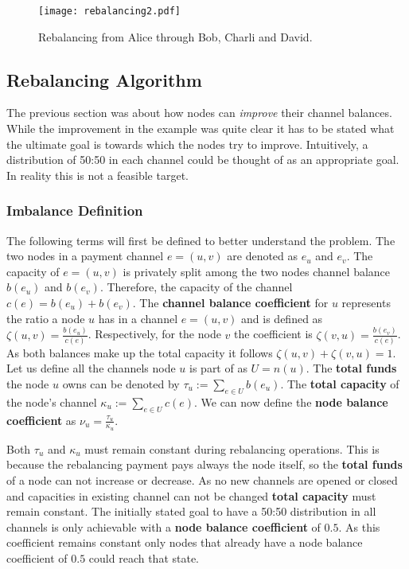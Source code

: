 \documentclass[final]{fhnwreport}       %
\begin{document}
\begin{figure}[H]
\centering
\texttt{[image: rebalancing2.pdf]}
\caption{Rebalancing from Alice through Bob, Charli and David.}
\label{fig:rebal2}
\end{figure}

\subsection{Rebalancing Algorithm}
The previous section was about how nodes can \textit{improve} their channel balances. While the improvement in the example was quite clear it has to be stated what the ultimate goal is towards which the nodes try to improve. Intuitively, a distribution of 50:50 in each channel could be thought of as an appropriate goal. In reality this is not a feasible target.

\subsubsection{Imbalance Definition}
The following terms will first be defined to better understand the problem. The two nodes in a payment channel $e=(u,v)$ are denoted as $e_u$ and $e_v$. The capacity of $e=(u,v)$ is privately split among the two nodes channel balance $b(e_u)$ and $b(e_v)$. Therefore, the capacity of the channel $c(e)=b(e_u)+b(e_v)$. The \textbf{channel balance coefficient } for $u$ represents the ratio a node $u$ has in a channel $e=(u,v)$ and is defined as $\zeta{(u,v)}=\frac{b(e_u)}{c(e)}$. Respectively, for the node $v$ the coefficient is $\zeta{(v,u)}=\frac{b(e_v)}{c(e)}$. As both balances make up the total capacity it follows  $\zeta{(u,v)} + \zeta{(v,u)}=1$. Let us define all the channels node $u$ is part of as $U=n(u)$. The \textbf{total funds} the node $u$ owns can be denoted by $\tau_u:=\displaystyle{\sum_{e\in U}b(e_u)}$. The \textbf{total capacity} of the node's channel $\kappa_u:=\displaystyle{\sum_{e\in U}c(e)}$. We can now define the \textbf{node balance coefficient} as $\nu_u = \frac{\tau_u}{\kappa_u}$.

Both $\tau_u$ and $\kappa_u$ must remain constant during rebalancing operations. This is because the rebalancing payment pays always the node itself, so the \textbf{total funds} of a node can not increase or decrease. As no new channels are opened or closed and capacities in existing channel can not be changed \textbf{total capacity} must remain constant. The initially stated goal to have a 50:50 distribution in all channels is only achievable with a \textbf{node balance coefficient} of $0.5$. As this coefficient remains constant only nodes that already have a node balance coefficient of $0.5$ could reach that state.
\end{document}
